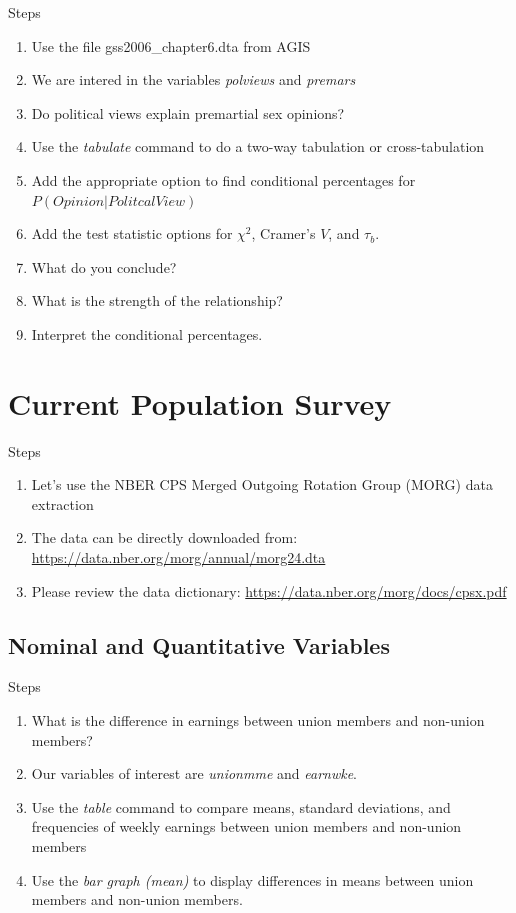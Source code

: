 \documentclass[
]{book}
\providecommand{\tightlist}{%
  \setlength{\itemsep}{0pt}\setlength{\parskip}{0pt}}
\begin{document}
Steps

\begin{enumerate}
\def\labelenumi{\arabic{enumi}.}
\tightlist
\item
  Use the file gss2006\_chapter6.dta from AGIS
\item
  We are intered in the variables \emph{polviews} and \emph{premars}
\item
  Do political views explain premartial sex opinions?
\item
  Use the \emph{tabulate} command to do a two-way tabulation or cross-tabulation
\item
  Add the appropriate option to find conditional percentages for \(P(Opinion | PolitcalView)\)
\item
  Add the test statistic options for \(\chi^2\), Cramer's \(V\), and \(\tau_b\).
\item
  What do you conclude?
\item
  What is the strength of the relationship?
\item
  Interpret the conditional percentages.
\end{enumerate}

\section{Current Population Survey}\label{current-population-survey}

Steps

\begin{enumerate}
\def\labelenumi{\arabic{enumi}.}
\tightlist
\item
  Let's use the NBER CPS Merged Outgoing Rotation Group (MORG) data extraction
\item
  The data can be directly downloaded from: \url{https://data.nber.org/morg/annual/morg24.dta}
\item
  Please review the data dictionary: \url{https://data.nber.org/morg/docs/cpsx.pdf}
\end{enumerate}

\subsection{Nominal and Quantitative Variables}\label{nominal-and-quantitative-variables}

Steps

\begin{enumerate}
\def\labelenumi{\arabic{enumi}.}
\tightlist
\item
  What is the difference in earnings between union members and non-union members?
\item
  Our variables of interest are \emph{unionmme} and \emph{earnwke}.
\item
  Use the \emph{table} command to compare means, standard deviations, and frequencies of weekly earnings between union members and non-union members
\item
  Use the \emph{bar graph (mean)} to display differences in means between union members and non-union members.
\end{enumerate}
\end{document}
